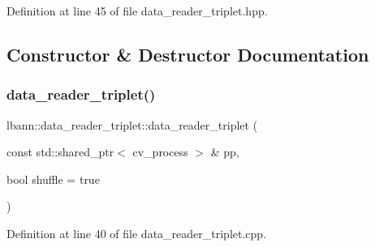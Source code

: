 Definition at line 45 of file data\+\_\+reader\+\_\+triplet.\+hpp.



\subsection{Constructor \& Destructor Documentation}
\mbox{\label{classlbann_1_1data__reader__triplet_ab0d6db1085010ea95fa1c01eccce0e6c}} 
\subsubsection{\texorpdfstring{data\+\_\+reader\+\_\+triplet()}{data\_reader\_triplet()}\hspace{0.1cm}{\footnotesize\ttfamily [1/2]}}
{\footnotesize\ttfamily lbann\+::data\+\_\+reader\+\_\+triplet\+::data\+\_\+reader\+\_\+triplet (\begin{DoxyParamCaption}\item[{const std\+::shared\+\_\+ptr$<$ cv\+\_\+process $>$ \&}]{pp,  }\item[{bool}]{shuffle = {\ttfamily true} }\end{DoxyParamCaption})}



Definition at line 40 of file data\+\_\+reader\+\_\+triplet.\+cpp.


